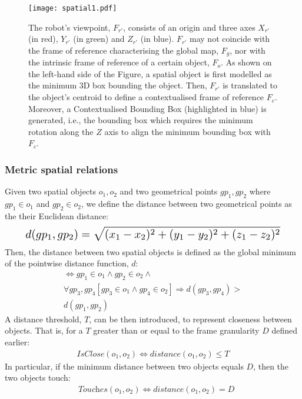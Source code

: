 \documentclass{article}
\begin{document}
\begin{figure*}
  \texttt{[image: spatial1.pdf]}
  \caption{The robot's viewpoint, $F_{r'}$, consists of an origin and three axes $X_{r'}$ (in red), $Y_{r'}$ (in green) and $Z_{r'}$ (in blue). $F_{r'}$ may not coincide with the frame of reference characterising the global map, $F_g$, nor with the intrinsic frame of reference of a certain object, $F_o$. As shown on the left-hand side of the Figure, a spatial object is first modelled as the minimum 3D box bounding the object. Then, $F_{r'}$ is translated to the object's centroid to define a contextualised frame of reference $F_c$. Moreover, a Contextualised Bounding Box (highlighted in blue) is generated, i.e., the bounding box which requires the minimum rotation along the $Z$ axis to align the minimum bounding box with $F_c$. }
  \label{fig:boxes} 
\end{figure*}


\subsubsection{Metric spatial relations} Given two spatial objects $o_1,o_2$ and two geometrical points $gp_1,gp_2$ where $gp_1 \in o_1$ and $gp_2 \in o_2$, we define the distance between two geometrical points as the their Euclidean distance:
\begin{equation}
\resizebox{.9\linewidth}{!}{$
    \displaystyle
    d(gp_1,gp_2) =  \sqrt{(x_1 -x_2)^2 + (y_1 -y_2)^2 + (z_1 -z_2)^2}
$}
\end{equation}
 Then, the distance between two spatial objects is defined as the global minimum of the pointwise distance function, $d$:
\begin{multline}
[\textit{distance}(o_1,o_2) =  d(gp_1,gp_2)] \Leftrightarrow  gp_1 \in o_1 \wedge gp_2 \in o_2 \wedge \\ 
\forall gp_3,gp_4 [gp_3 \in o_1 \wedge 
 gp_4 \in o_2] \Rightarrow d(gp_3,gp_4) > \\d(gp_1,gp_2) 
\end{multline}%
A distance threshold, $T$, can be then introduced, to represent closeness between objects. That is, for a $T$ greater than or equal to the frame granularity $D$ defined earlier:
\begin{align}
    \textit{IsClose}(o_1,o_2) \Leftrightarrow   \textit{distance} (o_1,o_2)  \leq T %
\end{align}
In particular, if the minimum distance between two objects equals $D$, then the two objects touch:
\begin{align}
   & \textit{Touches}(o_1,o_2) \Leftrightarrow  \textit{distance}(o_1,o_2) = D
\end{align}
\end{document}
